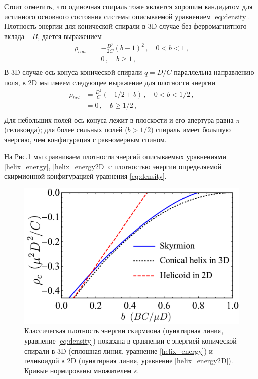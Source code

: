 \documentclass[a4paper,article,14pt]{extarticle}
\begin{document}
Стоит отметить, что одиночная спираль тоже является хорошим кандидатом для истинного основного состояния системы описываемой уравнением \eqref{eq:density}. Плотность энергии для конической спирали в 3D случае без ферромагнитного вклада $-B$, дается выражением \cite{Maleyev2006}
\begin{equation}
\label{helix_energy}
\begin{aligned}
\rho_{con} & = - \frac{D^{2}}{2C} (b-1)^{2} \,, \quad  0<b<1   \,, \\
 &= 0   \,, \quad  b \ge1 \,,  \\
\end{aligned}
\end{equation}
В 3D случае ось конуса конической спирали $q=D/C$ параллельна направлению поля, в 2D мы имеем следующее выражение для плотности энергии
 \begin{equation}
\begin{aligned}
\rho_{hel} & = \frac{D^{2}}{C} (-1/2+b) \,, \quad  0<b<1/2   \,, \\
 &= 0   \,, \quad  b \ge1/2 \,,  \\
\end{aligned}
\label{helix_energy2D}
\end{equation}
Для небольших полей ось конуса лежит в плоскости и его апертура равна $ \pi $ (геликоида); для более сильных полей ($ b > 1/2 $) спираль имеет большую энергию, чем конфигурация с равномерным спином.

На Рис.\ref{fig:Sk_v_helix} мы сравниваем плотности энергий описываемых уравнениями \eqref{helix_energy}, \eqref{helix_energy2D} с плотностью энергии определяемой скирмионной конфигурацией уравнения \eqref{eq:density}.


\begin{figure}[t]
\centering	
\includegraphics[width=0.85\columnwidth]{images/Sk_v_helix.pdf}
\caption{Классическая плотность энергии скирмиона (пунктирная линия, уравнение \eqref{eq:density}) показана в сравнении с энергией конической спирали в 3D (сплошная линия, уравнение \eqref{helix_energy}) и геликоидой в 2D (пунктирная линия, уравнение \eqref{helix_energy2D}). Кривые нормированы множителем $s$.}
\label{fig:Sk_v_helix}
\end{figure}
\end{document}
